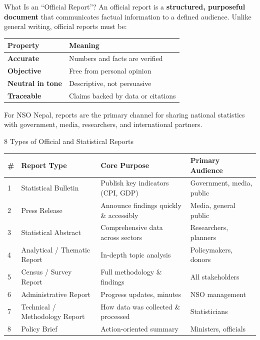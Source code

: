 \documentclass[xcolor={table,dvipsnames},aspectratio=169,11pt]{beamer}
\begin{document}
\begin{frame}{What Is an ``Official Report''?}
    An official report is a \textbf{structured, purposeful document} that communicates factual information to a defined audience. Unlike general writing, official reports must be:
    \vskip 0.2cm
    \footnotesize
    \begin{tabular}{lp{10cm}}
    \toprule
    \rowcolor{nsoBlue}\color{white}\bfseries Property & \color{white}\bfseries Meaning \\
    \midrule
    \textbf{Accurate} & Numbers and facts are verified \\
    \textbf{Objective} & Free from personal opinion \\
    \textbf{Neutral in tone} & Descriptive, not persuasive \\
    \textbf{Traceable} & Claims backed by data or citations \\
    \bottomrule
    \end{tabular}
    \vskip 0.2cm
    \begin{blockquote}
    \footnotesize For NSO Nepal, reports are the primary channel for sharing national statistics with government, media, researchers, and international partners.
    \end{blockquote}
\end{frame}

\begin{frame}{8 Types of Official and Statistical Reports}
    \tiny
    \begin{tabular}{ll>{\raggedright}p{5.5cm}>{\raggedright\arraybackslash}p{4cm}}
    \toprule
    \rowcolor{nsoBlue}\color{white}\bfseries \# & \color{white}\bfseries Report Type & \color{white}\bfseries Core Purpose & \color{white}\bfseries Primary Audience \\
    \midrule
    1 & Statistical Bulletin & Publish key indicators (CPI, GDP) & Government, media, public \\
    2 & Press Release & Announce findings quickly \& accessibly & Media, general public \\
    3 & Statistical Abstract & Comprehensive data across sectors & Researchers, planners \\
    4 & Analytical / Thematic Report & In-depth topic analysis & Policymakers, donors \\
    5 & Census / Survey Report & Full methodology \& findings & All stakeholders \\
    6 & Administrative Report & Progress updates, minutes & NSO management \\
    7 & Technical / Methodology Report & How data was collected \& processed & Statisticians \\
    8 & Policy Brief & Action-oriented summary & Ministers, officials \\
    \bottomrule
    \end{tabular}
\end{frame}
\end{document}
